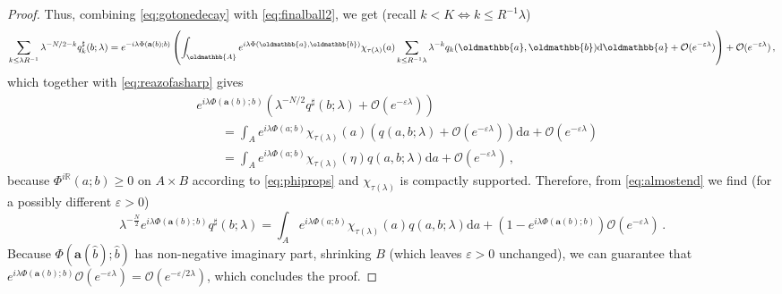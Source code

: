 \documentclass[
	fontsize=11pt, 
	twoside=false, 
	abstract=true, 
	a4paper,
]{scrartcl}
\newcommand{\eps}{\varepsilon}
\newcommand{\RR}{\mathbb{R}}
\newcommand{\dd}{\mathrm{d}}
\newcommand{\td}[1]{\tilde{#1}}
\newcommand{\mf}[1]{\oldmathbb{#1}}
\begin{document}
\begin{proof}
	Thus, combining \cref{eq:gotonedecay} with \cref{eq:finalball2}, we get (recall $k<K \iff k\leq R^{-1}\lambda$)%
	{\small\[
		\sum_{k\leq \lambda R^{-1}} \lambda^{-N/2-k}q^\sharp_{k}(b;\lambda) = e^{-i\lambda\Phi(\mathbf{a}(b);b)}\left(\int_{\mf{A}} e^{i\lambda\Phi(\mf{a},\mf{b})}\chi_{\tau(\lambda)}(a)\sum_{k\leq R^{-1}\lambda}\lambda^{-k}q_k(\mf{a},\mf{b})\dd \mf{a} +  \mathcal{O}(e^{-\eps\lambda})\right)+\mathcal{O}(e^{-\eps\lambda})\,,
	\]}
	which together with \cref{eq:reazofasharp} gives
	\begin{equation}\label{eq:almostend}
		\begin{aligned}
			&{}e^{i\lambda\Phi(\mathbf{a}(b);b)}\left(\lambda^{-N/2}q^\sharp(b;\lambda) + \mathcal{O}(e^{-\eps\lambda})\right) \\
			&\qquad=\int_A e^{i\lambda\Phi(a;b)}\chi_{\tau(\lambda)}(a)\left(q(a,b;\lambda) + \mathcal{O}(e^{-\eps\lambda})\right)\dd a+ \mathcal{O}(e^{-\eps\lambda}) \\
			&\qquad=\int_A e^{i\lambda\Phi(a;b)}\chi_{\tau(\lambda)}(\eta)q(a,b;\lambda) \dd a + \mathcal{O}(e^{-\eps\lambda})\,,
		\end{aligned}
	\end{equation}%
	because $\Phi^{i\RR}(a;b) \geq 0$ on $A\times B$ according to \cref{eq:phiprops} and $\chi_{\tau(\lambda)}$ is compactly supported. 
	Therefore, from \cref{eq:almostend} we find (for a possibly different $\eps>0$)
	\[
		\lambda^{-\frac{N}{2}}e^{i\lambda\Phi(\mathbf{a}(b);b)}q^\sharp(b;\lambda) = \int_A e^{i\lambda\Phi(a;b)}\chi_{\tau(\lambda)}(a)q(a,b;\lambda) \dd a + (1-e^{i\lambda\Phi(\mathbf{a}(b);b)})\mathcal{O}(e^{-\eps\lambda})\,.
	\]
	Because $\Phi(\mathbf{a}(\hat b);\hat b)$ has non-negative imaginary part, shrinking $B$ (which leaves $\eps>0$ unchanged), we can guarantee that $e^{i\lambda\Phi(\mathbf{a}(b);b)}\mathcal{O}(e^{-\eps\lambda}) = \mathcal{O}(e^{-\eps/2\lambda})$,
	which concludes the proof.

\end{proof}
\end{document}

